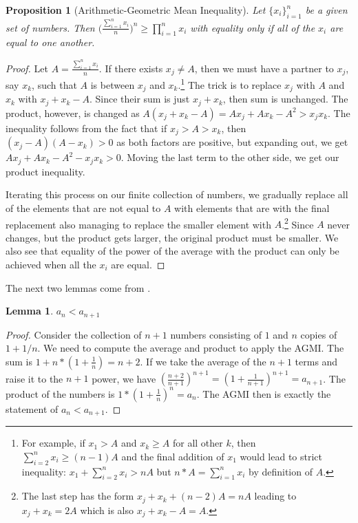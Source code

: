 \documentclass[12pt]{article}
\newtheorem{lemma}{Lemma}[subsection]
\newtheorem{proposition}{Proposition}[subsection]
\begin{document}
\begin{proposition}[Arithmetic-Geometric Mean Inequality]
    Let $\{x_i\}_{i=1}^n$ be a given set of numbers. Then $\big(\frac{\sum_{i=1}^n x_i}{n}\big)^n \geq  \prod_{i=1}^n x_i$ with equality only if all of the $x_i$ are equal to one another. 
\end{proposition}

\begin{proof}
    Let $A = \frac{\sum_{i=1}^n x_i}{n}$. If there exists $x_j \neq A$, then we must have a partner to $x_j$, say $x_k$, such that $A$ is between $x_j$ and $x_k$.\footnote{For example, if $x_1 > A$ and $x_k \geq A$ for all other $k$, then $\sum_{i=2}^n x_i \geq (n-1) A$ and the final addition of $x_1$ would lead to strict inequality: $x_1 + \sum_{i=2}^n x_i > n A$ but $n*A = \sum_{i=1}^n x_i$ by definition of $A$.} The trick is to replace $x_j$ with $A$ and $x_k$ with $x_j + x_k - A$. Since their sum is just $x_j + x_k$, then sum is unchanged. The product, however, is changed as $A(x_j + x_k - A) = Ax_j + A x_k - A^2 > x_j x_k$. The inequality follows from the fact that if $x_j > A > x_k$, then $(x_j - A)(A-x_k) > 0$ as both factors are positive, but expanding out, we get $A x_j + Ax_k - A^2 - x_j x_k > 0$. Moving the last term to the other side, we get our product inequality. 

    Iterating this process on our finite collection of numbers, we gradually replace all of the elements that are not equal to $A$ with elements that are with the final replacement also managing to replace the smaller element with $A$.\footnote{The last step has the form $x_j + x_k + (n-2)A = n A$ leading to $x_j +x_k = 2A$ which is also $x_j + x_k - A = A$.} Since $A$ never changes, but the product gets larger, the original product must be smaller. We also see that equality of the power of the average with the product can only be achieved when all the $x_i$ are equal.  
\end{proof}


The next two lemmas come from \cite{mend}.

\begin{lemma}
  $ a_n < a_{n+1}$ 
\end{lemma}

\begin{proof}
Consider the collection of $n+1$ numbers consisting of $1$ and $n$ copies of $1+1/n$. We need to compute the average and product to apply the AGMI. The sum is $1 + n* (1 + \frac{1}{n} ) = n+2$. If we take the average of the $n+1$ terms and raise it to the $n+1$ power, we have $(\frac{n+2}{n+1})^{n+1} = (1 + \frac{1}{n+1})^{n+1} = a_{n+1}$. The product of the numbers is $1*(1+\frac{1}{n})^n = a_n$. The AGMI then is exactly the statement of $a_n < a_{n+1}$.
\end{proof}
\end{document}
